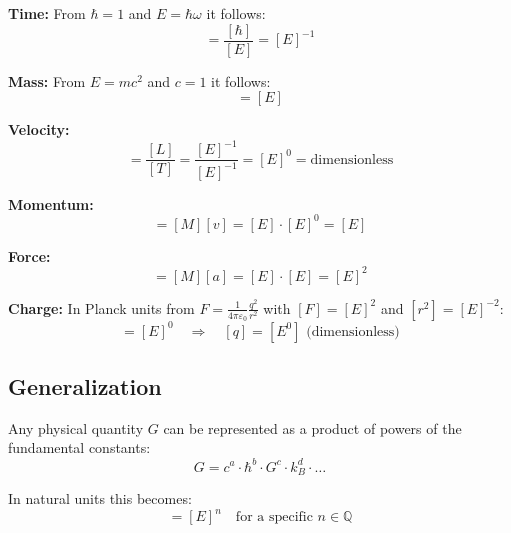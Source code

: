 	\textbf{Time:} From $\hbar = 1$ and $E = \hbar \omega$ it follows:
	\begin{equation}
		[T] = \frac{[\hbar]}{[E]} = [E]^{-1}
	\end{equation}
	
	\textbf{Mass:} From $E = mc^2$ and $c = 1$ it follows:
	\begin{equation}
		[M] = [E]
	\end{equation}
	
	\textbf{Velocity:} 
	\begin{equation}
		[v] = \frac{[L]}{[T]} = \frac{[E]^{-1}}{[E]^{-1}} = [E]^0 = \text{dimensionless}
	\end{equation}
	
	\textbf{Momentum:}
	\begin{equation}
		[p] = [M][v] = [E] \cdot [E]^0 = [E]
	\end{equation}
	
	\textbf{Force:}
	\begin{equation}
		[F] = [M][a] = [E] \cdot [E] = [E]^2
	\end{equation}
	
	\textbf{Charge:} In Planck units from $F = \frac{1}{4\pi\varepsilon_0} \frac{q^2}{r^2}$ with $[F] = [E]^2$ and $[r^2] = [E]^{-2}$:
	\begin{equation}
		[q^2] = [E]^0 \quad \Rightarrow \quad [q] = [E^0] \text{ (dimensionless)}
	\end{equation}
	
	\subsection{Generalization}
	
	Any physical quantity $G$ can be represented as a product of powers of the fundamental constants:
	\begin{equation}
		G = c^a \cdot \hbar^b \cdot G^c \cdot k_B^d \cdot \ldots
	\end{equation}
	
	In natural units this becomes:
	\begin{equation}
		[G] = [E]^n \quad \text{for a specific } n \in \mathbb{Q}
	\end{equation}
	
